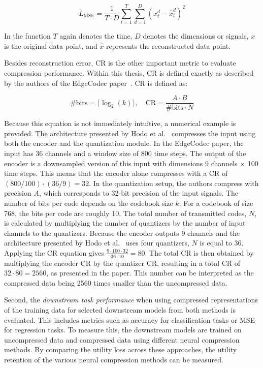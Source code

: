 \begin{equation}
L_{\mathrm{MSE}} = \frac{1}{T \cdot D} \sum_{t=1}^{T} \sum_{d=1}^{D} \left( x_t^d - \hat{x}_t^d \right)^2
\end{equation}

In the function $T$ again denotes the time, $D$ denotes the dimensions or signals, $x$ is the original data point, and $\hat{x}$ represents the reconstructed data point. 

Besides reconstruction error, CR is the other important metric to evaluate compression performance. Within this thesis, CR is defined exactly as described by the authors of the EdgeCodec paper~\cite{Hodo2025}. CR is defined as:

\begin{equation}
\#\text{bits} = \lceil \log_2(k) \rceil, \quad \text{CR} = \frac{A \cdot B}{\#\text{bits} \cdot N}
\end{equation}

Because this equation is not immediately intuitive, a numerical example is provided. The architecture presented by Hodo et al.~\cite{Hodo2025} compresses the input using both the encoder and the quantization module. In the EdgeCodec paper, the input has 36 channels and a window size of 800 time steps. The output of the encoder is a downsampled version of this input with dimensions 9 channels $\times$ 100 time steps. This means that the encoder alone compresses with a CR of $(800/100) \cdot (36/9) = 32$. In the quantization setup, the authors compress with precision $A$, which corresponds to 32-bit precision of the input signals. The number of bits per code depends on the codebook size $k$. For a codebook of size 768, the bits per code are roughly 10. The total number of transmitted codes, $N$, is calculated by multiplying the number of quantizers by the number of input channels to the quantizers. Because the encoder outputs 9 channels and the architecture presented by Hodo et al.~\cite{Hodo2025} uses four quantizers, $N$ is equal to 36. Applying the CR equation gives $\frac{9 \cdot 100 \cdot 32}{36 \cdot 10} = 80$. The total CR is then obtained by multiplying the encoder CR by the quantizer CR, resulting in a total CR of $32 \cdot 80 = 2560$, as presented in the paper. This number can be interpreted as the compressed data being 2560 times smaller than the uncompressed data. 

Second, the \textit{downstream task performance} when using compressed representations of the training data for selected downstream models from both methods is evaluated. This includes metrics such as accuracy for classification tasks or MSE for regression tasks. To measure this, the downstream models are trained on uncompressed data and compressed data using different neural compression methods. By comparing the utility loss across these approaches, the utility retention of the various neural compression methods can be measured.

